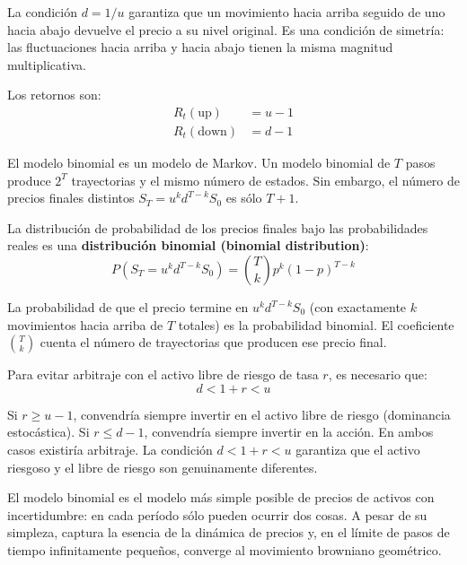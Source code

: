 \documentclass[12pt]{article}
\begin{document}
\begin{intuicionmat}
La condici\'on $d = 1/u$ garantiza que un movimiento hacia arriba seguido de uno hacia abajo devuelve el precio a su nivel original. Es una condici\'on de simetr\'ia: las fluctuaciones hacia arriba y hacia abajo tienen la misma magnitud multiplicativa.
\end{intuicionmat}

Los retornos son:
\begin{align}
    R_t(\text{up}) &= u - 1 \\
    R_t(\text{down}) &= d - 1
\end{align}

El modelo binomial es un modelo de Markov. Un modelo binomial de $T$ pasos produce $2^T$ trayectorias y el mismo n\'umero de estados. Sin embargo, el n\'umero de precios finales distintos $S_T = u^k d^{T-k} S_0$ es s\'olo $T+1$.

La distribuci\'on de probabilidad de los precios finales bajo las probabilidades reales es una \textbf{distribuci\'on binomial (binomial distribution)}:
\begin{equation}
    P(S_T = u^k d^{T-k} S_0) = \binom{T}{k} p^k (1-p)^{T-k}
\end{equation}

\begin{intuicionmat}
La probabilidad de que el precio termine en $u^k d^{T-k} S_0$ (con exactamente $k$ movimientos hacia arriba de $T$ totales) es la probabilidad binomial. El coeficiente $\binom{T}{k}$ cuenta el n\'umero de trayectorias que producen ese precio final.
\end{intuicionmat}

Para evitar arbitraje con el activo libre de riesgo de tasa $r$, es necesario que:
\begin{equation}
    d < 1 + r < u
\end{equation}

\begin{intuicionmat}
Si $r \geq u-1$, convendr\'ia siempre invertir en el activo libre de riesgo (dominancia estoc\'astica). Si $r \leq d-1$, convendr\'ia siempre invertir en la acci\'on. En ambos casos existir\'ia arbitraje. La condici\'on $d < 1+r < u$ garantiza que el activo riesgoso y el libre de riesgo son genuinamente diferentes.
\end{intuicionmat}

\begin{intuicion}
El modelo binomial es el modelo m\'as simple posible de precios de activos con incertidumbre: en cada per\'iodo s\'olo pueden ocurrir dos cosas. A pesar de su simpleza, captura la esencia de la din\'amica de precios y, en el l\'imite de pasos de tiempo infinitamente peque\~nos, converge al movimiento browniano geom\'etrico.
\end{intuicion}
\end{document}
